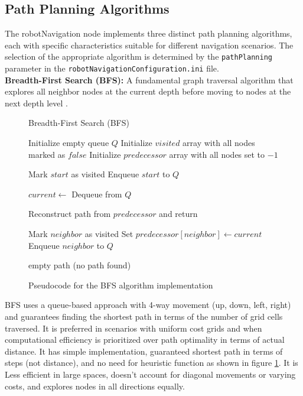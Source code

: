 \documentclass{CSSRforAfrica}
\begin{document}
\subsection*{Path Planning Algorithms}
The robotNavigation node implements three distinct path planning algorithms, each with specific characteristics suitable for different navigation scenarios. The selection of the appropriate algorithm is determined by the \texttt{pathPlanning} parameter in the \texttt{robotNavigationConfiguration.ini} file. \\

\noindent \textbf{Breadth-First Search (BFS):} A fundamental graph traversal algorithm that explores all neighbor nodes at the current depth before moving to nodes at the next depth level \cite{cormen2009introduction}. 
\begin{figure}[H]
	\centering
	\begin{minipage}{0.8\textwidth}
		\begin{algorithm}[H]
			\caption{Breadth-First Search (BFS)}
			\begin{algorithmic}[1]
				\State Initialize empty queue $Q$
				\State Initialize $visited$ array with all nodes marked as $false$
				\State Initialize $predecessor$ array with all nodes set to $-1$
				
				\State Mark $start$ as visited
				\State Enqueue $start$ to $Q$
				
				\State $current \gets$ Dequeue from $Q$
				
				\State Reconstruct path from $predecessor$ and return
				\EndIf
				
				\State Mark $neighbor$ as visited
				\State Set $predecessor[neighbor] \gets current$
				\State Enqueue $neighbor$ to $Q$
				\EndIf
				\EndFor
				\EndWhile
				
				\State \Return empty path (no path found)
				\EndFunction
			\end{algorithmic}
		\end{algorithm}
	\end{minipage}
	\caption{Pseudocode for the BFS algorithm implementation}
	\label{alg:bfs}
\end{figure}


\noindent BFS uses a queue-based approach with 4-way movement (up, down, left, right) and guarantees finding the shortest path in terms of the number of grid cells traversed. It is preferred in scenarios with uniform cost grids and when computational efficiency is prioritized over path optimality in terms of actual distance. It has simple implementation, guaranteed shortest path in terms of steps (not distance), and no need for heuristic function as shown in figure \ref{alg:bfs}. It is Less efficient in large spaces, doesn't account for diagonal movements or varying costs, and explores nodes in all directions equally.\\
\end{document}
